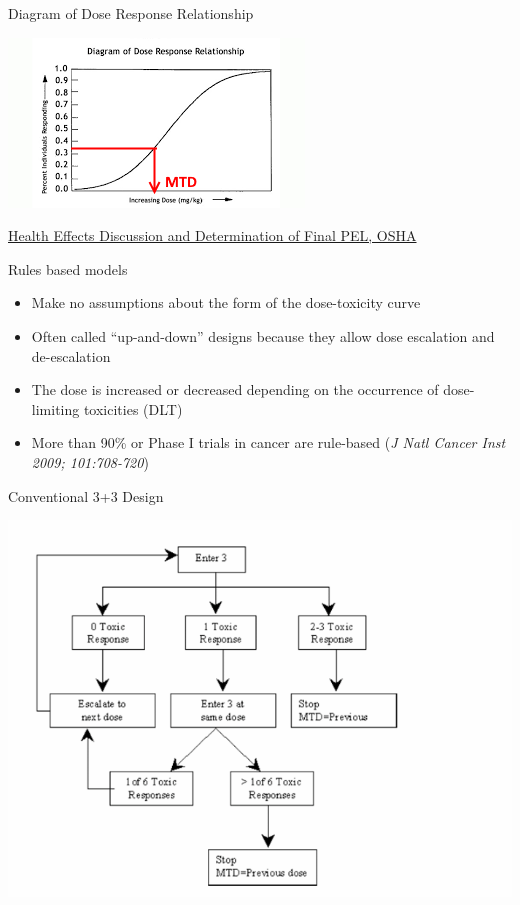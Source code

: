\documentclass{beamer}
\begin{document}
\begin{frame}{Diagram of Dose Response Relationship}

\begin{center}\includegraphics[scale=1.5]{images/Dose-Response_2.png} \end{center}


\href{https://www.osha.gov/pls/oshaweb/owadisp.show_document?p_id=770\&p_table=preambles}{Health
Effects Discussion and Determination of Final PEL, OSHA}

\end{frame}

\begin{frame}{Rules based models}

\begin{itemize}
\itemsep1pt\parskip0pt
\item
  Make no assumptions about the form of the dose-toxicity curve
\item
  Often called ``up-and-down'' designs because they allow dose
  escalation and de-escalation
\item
  The dose is increased or decreased depending on the occurrence of
  dose-limiting toxicities (DLT)
\item
  More than 90\% or Phase I trials in cancer are rule-based (\emph{J
  Natl Cancer Inst 2009; 101:708-720})
\end{itemize}

\end{frame}

\begin{frame}{Conventional 3+3 Design}

\begin{center}\includegraphics[scale=0.4]{images/Conventional3+3.png} \end{center}

\end{frame}
\end{document}
